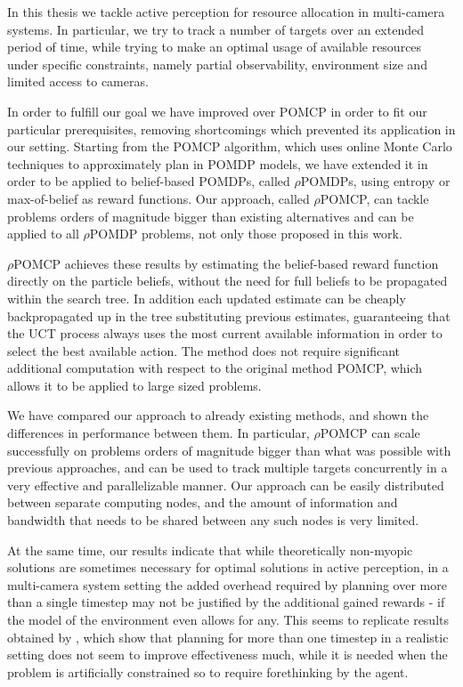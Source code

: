 In this thesis we tackle active perception for resource allocation in multi-camera systems. In
particular, we try to track a number of targets over an extended period of time, while trying to
make an optimal usage of available resources under specific constraints, namely partial
observability, environment size and limited access to cameras.

In order to fulfill our goal we have improved over POMCP \cite{cit:pomcp} in order to fit our
particular prerequisites, removing shortcomings which prevented its application in our setting.
Starting from the POMCP algorithm, which uses online Monte Carlo techniques to approximately plan in
POMDP models, we have extended it in order to be applied to belief-based POMDPs, called
$\rho$POMDPs, using entropy or max-of-belief as reward functions. Our approach, called $\rho$POMCP,
can tackle problems orders of magnitude bigger than existing alternatives and can be applied to all
$\rho$POMDP problems, not only those proposed in this work.

$\rho$POMCP achieves these results by estimating the belief-based reward function directly on the
particle beliefs, without the need for full beliefs to be propagated within the search tree. In
addition each updated estimate can be cheaply backpropagated up in the tree substituting previous
estimates, guaranteeing that the UCT process always uses the most current available information in
order to select the best available action. The method does not require significant additional
computation with respect to the original method POMCP, which allows it to be applied to large sized
problems.

We have compared our approach to already existing methods, and shown the differences in performance
between them. In particular, $\rho$POMCP can scale successfully on problems orders of magnitude
bigger than what was possible with previous approaches, and can be used to track multiple targets
concurrently in a very effective and parallelizable manner. Our approach can be easily distributed
between separate computing nodes, and the amount of information and bandwidth that needs to be
shared between any such nodes is very limited.

At the same time, our results indicate that while theoretically non-myopic solutions are sometimes
necessary for optimal solutions in active perception, in a multi-camera system setting the added
overhead required by planning over more than a single timestep may not be justified by the
additional gained rewards - if the model of the environment even allows for any. This seems to
replicate results obtained by \cite{cit:relworktanks}, which show that planning for more than one
timestep in a realistic setting does not seem to improve effectiveness much, while it is needed when
the problem is artificially constrained so to require forethinking by the agent.

